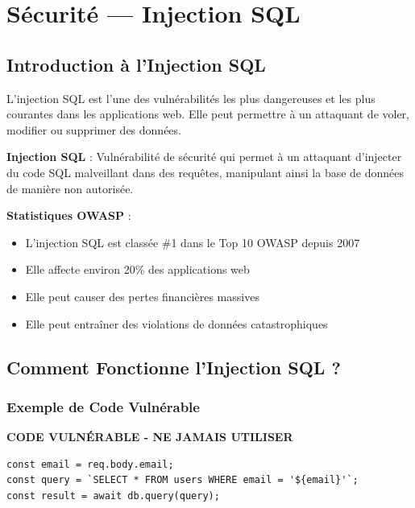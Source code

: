\chapter{Sécurité — Injection SQL}

\section{Introduction à l'Injection SQL}

L'injection SQL est l'une des vulnérabilités les plus dangereuses et les plus courantes dans les applications web. Elle peut permettre à un attaquant de voler, modifier ou supprimer des données.

\begin{definitionbox}
    \textbf{Injection SQL} : Vulnérabilité de sécurité qui permet à un attaquant d'injecter du code SQL malveillant dans des requêtes, manipulant ainsi la base de données de manière non autorisée.
\end{definitionbox}

\begin{securitybox}
    \textbf{Statistiques OWASP} :
    \begin{itemize}
        \item L'injection SQL est classée \#1 dans le Top 10 OWASP depuis 2007
        \item Elle affecte environ 20\% des applications web
        \item Elle peut causer des pertes financières massives
        \item Elle peut entraîner des violations de données catastrophiques
    \end{itemize}
\end{securitybox}

\section{Comment Fonctionne l'Injection SQL ?}

\subsection{Exemple de Code Vulnérable}

\begin{errorbox}
    \textbf{CODE VULNÉRABLE - NE JAMAIS UTILISER}
    
    \begin{lstlisting}[style=javascript]
const email = req.body.email;
const query = `SELECT * FROM users WHERE email = '${email}'`;
const result = await db.query(query);
    \end{lstlisting}
\end{errorbox}

